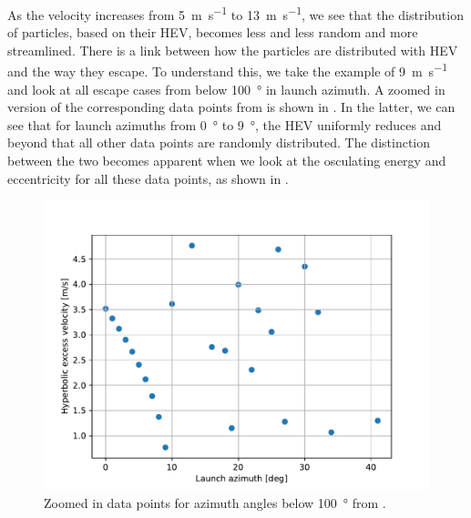 As the velocity increases from \SI{5}{\metre\per\second} to \SI{13}{\metre\per\second}, we see that the distribution of particles, based on their \gls{HEV}, becomes less and less random and more streamlined. There is a link between how the particles are distributed with \gls{HEV} and the way they escape. To understand this, we take the example of \SI{9}{\metre\per\second} and look at all escape cases from below \SI{100}{\degree} in launch azimuth. A zoomed in version of the corresponding data points from  is shown in . In the latter, we can see that for launch azimuths from \SI{0}{\degree} to \SI{9}{\degree}, the \gls{HEV} uniformly reduces and beyond that all other data points are randomly distributed. The distinction between the two becomes apparent when we look at the osculating energy and eccentricity for all these data points, as shown in .
\begin{figure}[htb]
\centering
\captionsetup{justification=centering}
\includegraphics[width=\textwidth, height=0.3\textheight, keepaspectratio=true]{Images/longest_edge_no_perturbations/escape_hev_9ms_lowerAzimuth.pdf}
\caption{Zoomed in data points for azimuth angles below \SI{100}{\degree} from \protect{}.}
\label{fig:hev_9ms_lowerAzimuths_noSP}
\end{figure}
\FloatBarrier
